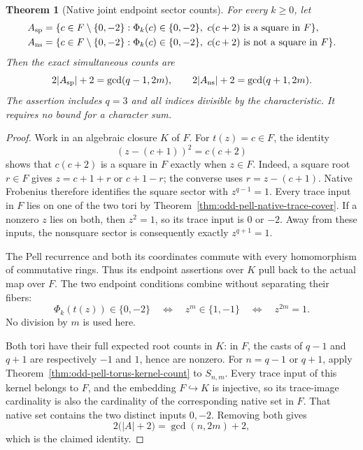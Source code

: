 \documentclass[11pt]{article}
\newtheorem{theorem}{Theorem}[section]
\begin{document}
\begin{theorem}[Native joint endpoint sector counts]
\label{thm:odd-pell-native-sector-counts}
For every \(k\ge0\), let
\[
 \begin{split}
 A_{\rm sp}&=\{c\in F\setminus\{0,-2\}:
   \Phi_k(c)\in\{0,-2\},\ c(c+2)\text{ is a square in }F\},\\
 A_{\rm ns}&=\{c\in F\setminus\{0,-2\}:
   \Phi_k(c)\in\{0,-2\},\ c(c+2)\text{ is not a square in }F\}.
 \end{split}
\]
Then the exact simultaneous counts are
\[
 2|A_{\rm sp}|+2=\gcd(q-1,2m),\qquad
 2|A_{\rm ns}|+2=\gcd(q+1,2m).
\]
The assertion includes \(q=3\) and all indices divisible by the
characteristic. It requires no bound for a character sum.
\end{theorem}
\begin{proof}
Work in an algebraic closure \(K\) of \(F\).
For \(t(z)=c\in F\), the identity
\[
 (z-(c+1))^2=c(c+2)
\]
shows that \(c(c+2)\) is a square in \(F\) exactly when \(z\in F\).
Indeed, a square root \(r\in F\) gives \(z=c+1+r\) or \(c+1-r\);
the converse uses \(r=z-(c+1)\).
Native Frobenius therefore identifies the square sector with
\(z^{q-1}=1\). Every trace input in \(F\) lies on one of the two tori
by Theorem~\ref{thm:odd-pell-native-trace-cover}.
If a nonzero \(z\) lies on both, then \(z^2=1\), so its trace input
is \(0\) or \(-2\). Away from these inputs, the nonsquare sector
is consequently exactly \(z^{q+1}=1\).

The Pell recurrence and both its coordinates commute with every
homomorphism of commutative rings. Thus its endpoint assertions
over \(K\) pull back to the actual map over \(F\).
The two endpoint conditions combine without separating their fibers:
\[
 \Phi_k(t(z))\in\{0,-2\}
 \quad\Longleftrightarrow\quad
 z^m\in\{1,-1\}
 \quad\Longleftrightarrow\quad z^{2m}=1.
\]
No division by \(m\) is used here.

Both tori have their full expected root counts in \(K\):
in \(F\), the casts of \(q-1\) and \(q+1\) are respectively
\(-1\) and \(1\), hence are nonzero.
For \(n=q-1\) or \(q+1\), apply
Theorem~\ref{thm:odd-pell-torus-kernel-count} to
\(S_{n,m}\).
Every trace input of this kernel belongs to \(F\), and the embedding
\(F\hookrightarrow K\) is injective, so its trace-image cardinality
is also the cardinality of the corresponding native set in \(F\).
That native set contains the two distinct inputs \(0,-2\).
Removing both gives
\[
 2\bigl(|A|+2\bigr)=\gcd(n,2m)+2,
\]
which is the claimed identity.
\end{proof}
\end{document}
